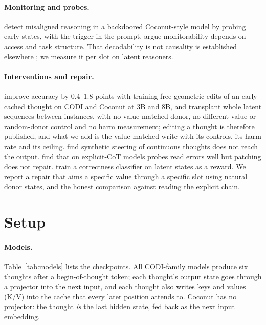 \documentclass{article}
\begin{document}
\paragraph{Monitoring and probes.} \citet{ramjee2026ulterior} detect misaligned reasoning in a backdoored Coconut-style model by probing early states, with the trigger in the prompt. \citet{ferreira2026outofsight} argue monitorability depends on access and task structure. That decodability is not causality is established elsewhere \citep{openproblems2025,decodability2026,singleposition2026}; we measure it per slot on latent reasoners.

\paragraph{Interventions and repair.} \citet{chang2026unlocking} improve accuracy by 0.4--1.8 points with training-free geometric edits of an early cached thought on CODI and Coconut at 3B and 8B, and transplant whole latent sequences between instances, with no value-matched donor, no different-value or random-donor control and no harm measurement; editing a thought is therefore published, and what we add is the value-matched write with its controls, its harm rate and its ceiling. \citet{huang2026steering} find synthetic steering of continuous thoughts does not reach the output. \citet{hiddenerror2026} find that on explicit-CoT models probes read errors well but patching does not repair. \citet{lto2026} train a correctness classifier on latent states as a reward. We report a repair that aims a specific value through a specific slot using natural donor states, and the honest comparison against reading the explicit chain.

\section{Setup}\label{sec:setup}

\paragraph{Models.} Table~\ref{tab:models} lists the checkpoints. All CODI-family models produce six thoughts after a begin-of-thought token; each thought's output state goes through a projector into the next input, and each thought also writes keys and values (K/V) into the cache that every later position attends to. Coconut has no projector: the thought \emph{is} the last hidden state, fed back as the next input embedding.
\end{document}
